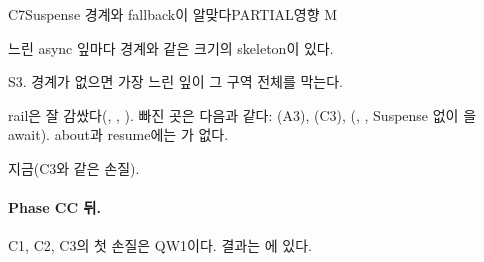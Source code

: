 \begin{checkitem}{\ckopen}{C7}{Suspense 경계와 fallback이 알맞다}{PARTIAL\ckdot{}영향 M}
  \item[What] 느린 async 잎마다 경계와 같은 크기의 skeleton이 있다.
  \item[Why] S3. 경계가 없으면 가장 느린 잎이 그 구역 전체를 막는다.
  \item[How] rail은 잘 감쌌다(, , ). 빠진 곳은 다음과 같다: (A3), (C3), (, , Suspense 없이 을 await). about과 resume에는 가 없다.
  \item[When] 지금(C3와 같은 손질).
\end{checkitem}

\paragraph{Phase CC 뒤.}
C1, C2, C3의 첫 손질은 QW1이다. 결과는 에 있다.
